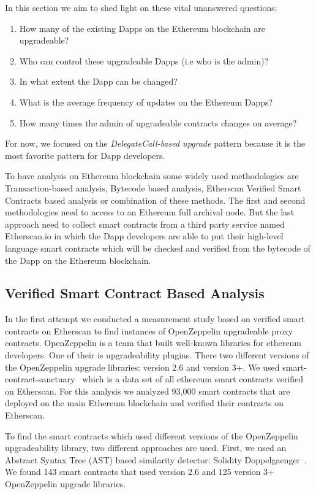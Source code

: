  In this section we aim to shed light on these vital unanswered questions: 
 \begin{enumerate}
  \item How many of the existing Dapps on the Ethereum blockchain are upgradeable?
  \item Who can control these upgradeable Dapps (i.e who is the admin)? 
  \item In what extent the Dapp can be changed?
  \item What is the average frequency of updates on the Ethereum Dapps?
  \item How many times the admin of upgradeable contracts changes on average?
\end{enumerate}

For now, we focused on the \textit{DelegateCall-based upgrade} pattern because it is the most favorite pattern for Dapp developers.

To have analysis on Ethereum blockchain some widely used methodologies are Transaction-based analysis, Bytecode based analysis, Etherscan Verified Smart Contracts based analysis or combination of these methods. The first and second methodologies need to access to an Ethereum full archival node. But the last approach need to collect smart contracts from a third party service named Etherscan.io in which the Dapp developers are able to put their high-level language smart contracts which will be checked and verified from the bytecode of the Dapp on the Ethereum blockchain.

\subsection{Verified Smart Contract Based Analysis}
In the first attempt we conducted a measurement study based on verified smart contracts on Etherscan to find instances of OpenZeppelin upgradeable proxy contracts. OpenZeppelin is a team that built well-known libraries for ethereum developers. One of their is upgradeability plugins. There two different versions of the OpenZeppelin upgrade libraries: version 2.6 and version 3+. 
We used smart-contract-sanctuary~\cite{smart_contract_sanctuary} which is a data set of all ethereum smart contracts verified on Etherscan. For this analysis we analyzed 93,000 smart contracts that are deployed on the main Ethereum blockchain and verified their contracts on Etherscan. 

To find the smart contracts which used different versions of the OpenZeppelin upgradeability library, two different approaches are used. First, we used an Abstract Syntax Tree (AST) based similarity detector: Solidity Doppelgaenger~\cite{solidity-doppelganger}. We found 143 smart contracts that used version 2.6 and 125 version 3+ OpenZeppelin upgrade libraries. 

